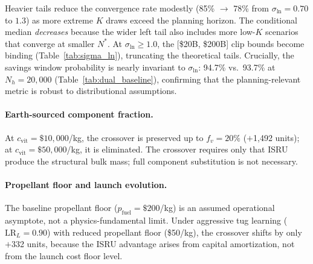 \documentclass[5p,twocolumn]{elsarticle}
\begin{document}
\begin{table}[htbp]
\centering
\caption{Dual-baseline headline results: crossover statistics at $\sigma_{\ln} = 0.70$ (terrestrial reference class) and $\sigma_{\ln} = 1.0$ (space-specific reference class), 10{,}000~MC runs, $H = 40{,}000$. \emph{Note:} this table uses a $\sigma_{\ln}$-variation ensemble; the canonical baseline results are in Table~\ref{tab:mc_summary}.}
\label{tab:dual_baseline}
\small
{}
\end{table}

Heavier tails reduce the convergence rate modestly (85\% $\to$ 78\% from $\sigma_{\ln} = 0.70$ to $1.3$) as more extreme $K$ draws exceed the planning horizon. The conditional median \emph{decreases} because the wider left tail also includes more low-$K$ scenarios that converge at smaller $N^*$. At $\sigma_{\ln} \geq 1.0$, the [\$20B, \$200B] clip bounds become binding (Table~\ref{tab:sigma_ln}), truncating the theoretical tails. Crucially, the savings window probability is nearly invariant to $\sigma_{\ln}$: 94.7\% vs.\ 93.7\% at $N_h = 20{,}000$ (Table~\ref{tab:dual_baseline}), confirming that the planning-relevant metric is robust to distributional assumptions.

\paragraph{Earth-sourced component fraction.} At $c_{\mathrm{vit}} = \$10{,}000$/kg, the crossover is preserved up to $f_v = 20\%$ ($+$1{,}492 units); at $c_{\mathrm{vit}} = \$50{,}000$/kg, it is eliminated. The crossover requires only that ISRU produce the structural bulk mass; full component substitution is not necessary.

\paragraph{Propellant floor and launch evolution.} The baseline propellant floor ($p_{\mathrm{fuel}} = \$200$/kg) is an assumed operational asymptote, not a physics-fundamental limit. Under aggressive tug learning ($\mathrm{LR}_L = 0.90$) with reduced propellant floor (\$50/kg), the crossover shifts by only $+$332 units, because the ISRU advantage arises from capital amortization, not from the launch cost floor level.
\end{document}
